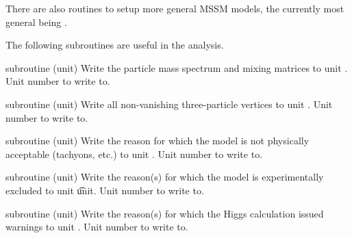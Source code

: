 There are also routines to setup more general MSSM models, the currently most general being .

The following subroutines are useful in the analysis.

\begin{sub}{subroutine (unit)}
   Write the particle mass spectrum and mixing matrices
  to unit .
   Unit number to write to.
\end{sub}

\begin{sub}{subroutine (unit)}
   Write all non-vanishing three-particle vertices to
  unit .
   Unit number to write to.
\end{sub}

\begin{sub}{subroutine (unit)}
   Write the reason for which the model is not
  physically acceptable (tachyons, etc.) to unit .
   Unit number to write to.
\end{sub}

\begin{sub}{subroutine (unit)}
   Write the reason(s) for which the model is
  experimentally excluded  to unit \t{unit}.
   Unit number to write to.
\end{sub}  

\begin{sub}{subroutine (unit)}
   Write the reason(s) for which the Higgs
  calculation issued warnings to unit .
   Unit number to write to.
\end{sub}  


